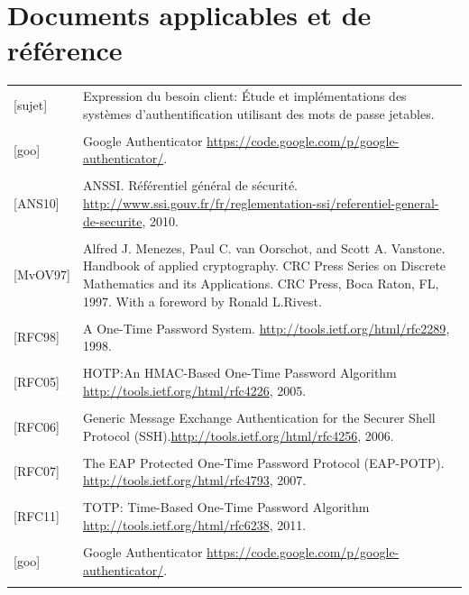 \documentclass{"../../res/univ-projet"}
\begin{document}
\newpage
\section{Documents applicables et de référence}

\begin{tabular}{p{}>{\raggedright\arraybackslash}p{13cm}}
{[sujet]} & {Expression du besoin client: Étude et implémentations des systèmes d'authentification utilisant des mots de passe jetables.}
\tabularnewline
\\
{[goo]} & {Google Authenticator \href{https://code.google.com/p/google-authenticator/}{https://code.google.com/p/google-authenticator/}.}
\tabularnewline
\\
{[ANS10]} & {ANSSI. Référentiel général de sécurité. \href{http://www.ssi.gouv.fr/fr/reglementation-ssi/referentiel-general-de-securite}{http://www.ssi.gouv.fr/fr/reglementation-ssi/referentiel-general-de-securite}, 2010.}
\tabularnewline
\\
{[MvOV97]} & {Alfred J. Menezes, Paul C. van Oorschot, and Scott A. Vanstone. Handbook of applied cryptography. CRC Press Series on Discrete Mathematics and its Applications. CRC Press, Boca Raton, FL, 1997. With a foreword by Ronald L.Rivest.}
\tabularnewline
\\
{[RFC98]} & {A One-Time Password System. \href{http://tools.ietf.org/html/rfc2289}{http://tools.ietf.org/html/rfc2289}, 1998.}
\tabularnewline
\\
{[RFC05]} & {HOTP:An HMAC-Based One-Time Password Algorithm \href{http://tools.ietf.org/html/rfc4226}{http://tools.ietf.org/html/rfc4226}, 2005.}
\tabularnewline
\\
{[RFC06]} & {Generic Message Exchange Authentication for the Securer Shell Protocol (SSH).\href{http://tools.ietf.org/html/rfc4256}{http://tools.ietf.org/html/rfc4256}, 2006.}
\tabularnewline
\\
{[RFC07]} & {The EAP Protected One-Time Password Protocol (EAP-POTP). \href{http://tools.ietf.org/html/rfc4793}{http://tools.ietf.org/html/rfc4793}, 2007.}
\tabularnewline
\\
{[RFC11]} & {TOTP: Time-Based One-Time Password Algorithm \href{http://tools.ietf.org/html/rfc6238}{http://tools.ietf.org/html/rfc6238}, 2011.}
\tabularnewline
\\
{[goo]} & {Google Authenticator \href{https://code.google.com/p/google-authenticator/}{https://code.google.com/p/google-authenticator/}.}
\tabularnewline
\\
\end{tabular}
\end{document}
